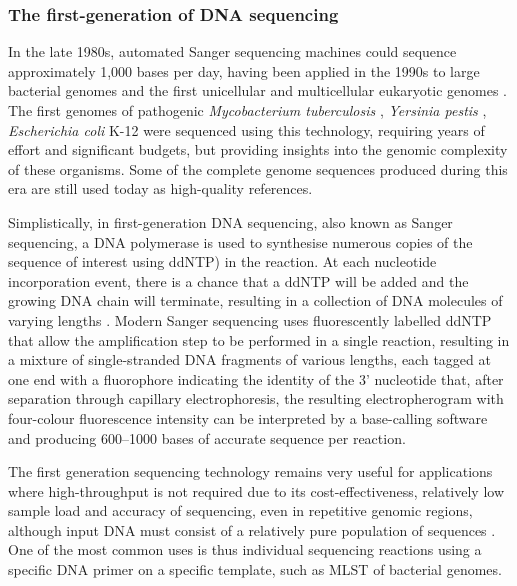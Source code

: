 \subsubsection{The first-generation of DNA sequencing} \label{ssec:_intro_1st_gen_seq}

In the late 1980s, automated Sanger sequencing machines could sequence approximately 1,000 bases per day, having been applied in the 1990s to large bacterial genomes and the first unicellular and multicellular eukaryotic genomes \citep{koch_sequencing_2021}. 
The first genomes of pathogenic \textit{Mycobacterium tuberculosis} \citep{cole_deciphering_1998}, \textit{Yersinia pestis} \citep{parkhill_genome_2001}, \textit{Escherichia coli} K-12 \citep{blattner_complete_1997} were sequenced using this technology, requiring years of effort and significant budgets, but providing insights into the genomic complexity of these organisms. 
Some of the complete genome sequences produced during this era are still used today as high-quality references. 

Simplistically, in first-generation DNA sequencing, also known as Sanger sequencing, a DNA polymerase is used to synthesise numerous copies of the sequence of interest using \ac{ddNTP}) in the reaction. 
At each nucleotide incorporation event, there is a chance that a \ac{ddNTP} will be added and the growing DNA chain will terminate, resulting in a collection of DNA molecules of varying lengths \citep{sanger_dna_1977, hagemann_overview_2015}. 
Modern Sanger sequencing uses fluorescently labelled \ac{ddNTP} that allow the amplification step to be performed in a single reaction, resulting in a mixture of single-stranded DNA fragments of various lengths, each tagged at one end with a fluorophore indicating the identity of the 3' nucleotide that, after separation through capillary electrophoresis, the resulting electropherogram with four-colour fluorescence intensity can be interpreted by a base-calling software and producing 600–1000 bases of accurate sequence per reaction\citep{hagemann_overview_2015}. 

The first generation sequencing technology remains very useful for applications where high-throughput is not required due to its cost-effectiveness, relatively low sample load and accuracy of sequencing, even in repetitive genomic regions, although input DNA must consist of a relatively pure population of sequences \citep{slatko_overview_2018}. 
One of the most common uses is thus individual sequencing reactions using a specific DNA primer on a specific template, such as \ac{MLST} of bacterial genomes. 

